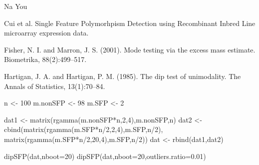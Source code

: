 \begin{Author}\relax
Na You
\end{Author}
\begin{References}\relax
Cui et al.
Single Feature Polymorhpism Detection using Recombinant Inbred Line
microarray expression data.

Fisher, N. I. and Marron, J. S. (2001).
Mode testing via the excess mass estimate. Biometrika, 88(2):499--517.

Hartigan, J. A. and Hartigan, P. M. (1985).
The dip test of unimodality. The Annals of Statistics, 13(1):70–84.
\end{References}
\begin{SeeAlso}\relax
{}
\end{SeeAlso}
\begin{Examples}
\begin{ExampleCode}
n <- 100
m.nonSFP <- 98
m.SFP <- 2

dat1 <- matrix(rgamma(m.nonSFP*n,2,4),m.nonSFP,n)
dat2 <- cbind(matrix(rgamma(m.SFP*n/2,2,4),m.SFP,n/2),
              matrix(rgamma(m.SFP*n/2,20,4),m.SFP,n/2))
dat <- rbind(dat1,dat2)

dipSFP(dat,nboot=20)
dipSFP(dat,nboot=20,outliers.ratio=0.01)
\end{ExampleCode}
\end{Examples}

